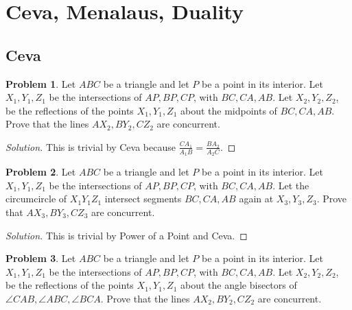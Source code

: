\documentclass[a4paper]{article}
\theoremstyle{definition}
\newtheorem{problem}{Problem}[subsection]
\begin{document}
\lhead{\today}

\section{Ceva, Menalaus, Duality}
\subsection{Ceva}

\begin{problem}
Let $ABC$ be a triangle and let $P$ be a point in its interior. Let $X_1, Y_1, Z_1$ be the intersections of $AP, BP, CP$, with $BC, CA, AB$. Let $X_2, Y_2, Z_2$, be the reflections of the points $X_1, Y_1, Z_1$ about the midpoints of $BC, CA, AB$. Prove that the lines $AX_2, BY_2, CZ_2$ are concurrent.
\end{problem}

\begin{proof}[Solution]
This is trivial by Ceva because $\frac{CA_1}{A_1B} = \frac{BA_2}{A_2C}$.
\end{proof}

\begin{problem}
Let $ABC$ be a triangle and let $P$ be a point in its interior. Let $X_1, Y_1, Z_1$ be the intersections of $AP, BP, CP$, with $BC, CA, AB$. Let the circumcircle of $X_1Y_1Z_1$ intersect segments $BC, CA, AB$ again at $X_3, Y_3, Z_3$. Prove that $AX_3, BY_3, CZ_3$ are concurrent.
\end{problem}

\begin{proof}[Solution]
This is trivial by Power of a Point and Ceva.
\end{proof}

\begin{problem}
Let $ABC$ be a triangle and let $P$ be a point in its interior. Let $X_1, Y_1, Z_1$ be the intersections of $AP, BP, CP$, with $BC, CA, AB$. Let $X_2, Y_2, Z_2$, be the reflections of the points $X_1, Y_1, Z_1$ about the angle bisectors of $\angle CAB, \angle ABC, \angle BCA$. Prove that the lines $AX_2, BY_2, CZ_2$ are concurrent.
\end{problem}
\end{document}

